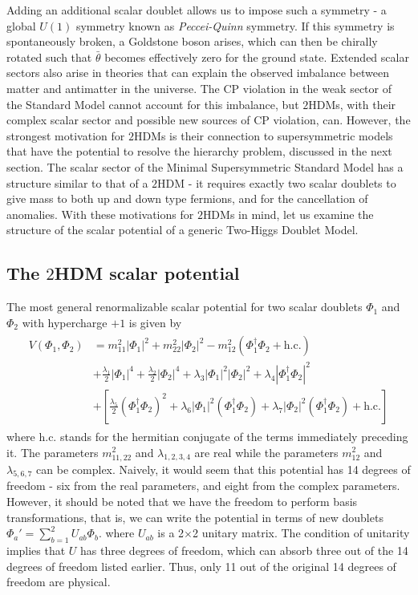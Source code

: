 Adding an additional scalar doublet allows us to impose such a symmetry - a global $U(1)$ symmetry known as \emph{Peccei-Quinn} symmetry. If this symmetry is spontaneously broken, a Goldstone boson arises, which can then be chirally rotated such that $\bar{\theta}$ becomes effectively zero for the ground state.
Extended scalar sectors also arise in theories that can explain the observed imbalance between matter and antimatter in the universe. The CP violation in the weak sector of the Standard Model cannot account for this imbalance, but $2$HDMs, with their complex scalar sector and possible new sources of CP violation, can.
%
However, the strongest motivation for $2$HDMs is their connection to supersymmetric models that have the potential to resolve the hierarchy problem, discussed in the next section. The scalar sector of the Minimal Supersymmetric Standard Model  has a structure similar to that of a $2$HDM - it requires exactly two scalar doublets to give mass to both up and down type fermions, and for the cancellation of anomalies. With these motivations for $2$HDMs in mind, let us examine the structure of the scalar potential of a generic Two-Higgs Doublet Model.

\subsection{The $2$HDM scalar potential}
The most general renormalizable scalar potential for two scalar doublets $\Phi_1$ and $\Phi_2$ with hypercharge $+1$ is given by
\strictpagecheck
{}
\begin{align}
\label{eq:2HDM_scalar_potential}
  \begin{split}
  V(\Phi_1,\Phi_2) &= m_{11}^2|\Phi_1|^2 + m_{22}^2|\Phi_2|^2 - m_{12}^2\left(\Phi_1^\dagger\Phi_2 + \text{h.c.}\right)\\
&+\frac{\lambda_1}{2}|\Phi_1|^4 + \frac{\lambda_2}{2}|\Phi_2|^4+\lambda_3|\Phi_1|^2|\Phi_2|^2 + \lambda_4|\Phi_1^\dagger\Phi_2|^2\\
&+\left[\frac{\lambda_5}{2}\left(\Phi_1^\dagger\Phi_2 \right)^2+\lambda_6|\Phi_1|^2(\Phi_1^\dagger\Phi_2)+\lambda_7|\Phi_2|^2(\Phi_1^\dagger\Phi_2) + \text{h.c.}\right]
\end{split}
\end{align}
where h.c. stands for the hermitian conjugate of the terms immediately preceding it. The parameters $m_{11,22}^2$ and $\lambda_{1,2,3,4}$ are real while the parameters $m_{12}^2$ and $\lambda_{5,6,7}$ can be complex. Naively, it would seem that this potential has 14 degrees of freedom - six from the real parameters, and eight from the complex parameters. However, it should be noted that we have the freedom to perform basis transformations, that is, we can write the potential in terms of new doublets $\Phi_a' = \sum_{b=1}^2U_{ab}\Phi_b$. where $U_{ab}$ is a 2$\times$2 unitary matrix. The condition of unitarity implies that $U$ has three degrees of freedom, which can absorb three out of the 14 degrees of freedom listed earlier. Thus, only 11 out of the original 14 degrees of freedom are physical.

